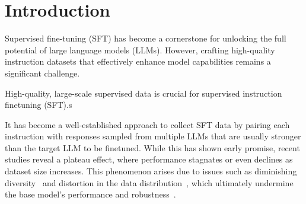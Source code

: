 \section{Introduction}

Supervised fine-tuning (SFT) has become a cornerstone for unlocking the full potential of large language models (LLMs). However, crafting high-quality instruction datasets that effectively enhance model capabilities remains a significant challenge.

High-quality, large-scale supervised data is crucial for supervised instruction finetuning (SFT).s 


It has become a well-established approach to collect SFT data by pairing each instruction with responses sampled from multiple LLMs that are usually stronger than the target LLM to be finetuned.
While this has shown early promise, recent studies reveal a plateau effect, where performance stagnates or even declines as dataset size increases. 
This phenomenon arises due to issues such as diminishing diversity~\cite{padmakumar2024writing, guo2023curious} and distortion in the data distribution~\cite{lebrun2021evaluating}, which ultimately undermine the base model's performance and robustness~\cite{alemohammad2024selfconsuming, gerstgrasser2024iscollapseinevitable, shumailov2023curse,dohmatob2024strongmodelcollapse,Hataya_2023_ICCV,martínez2023combining,martínez2023understanding,bohacek2023nepotistically,briesch2023large}.



